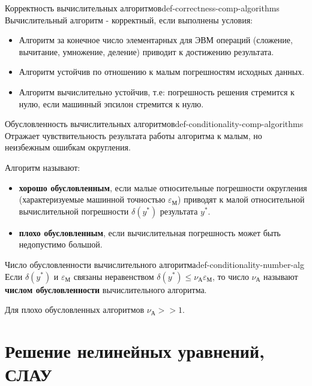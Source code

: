 \documentclass[14pt]{extarticle}
\begin{document}
    \begin{definition}{Корректность вычислительных алгоритмов}{def-correctness-comp-algorithms}
        Вычислительный алгоритм - корректный, если выполнены условия:
        \begin{itemize}
            \item Алгоритм за конечное число элементарных для ЭВМ операций (сложение, вычитание, умножение, деление) приводит к достижению результата.
            \item Алгоритм устойчив по отношению к малым погрешностям исходных данных.
            \item Алгоритм вычислительно устойчив, т.е: погрешность решения стремится к нулю, если машинный эпсилон стремится к нулю.
        \end{itemize}
    \end{definition}

    \begin{definition}{Обусловленность вычислительных алгоритмов}{def-conditionality-comp-algorithms}
        Отражает чувствительность результата работы алгоритма к малым, но неизбежным ошибкам округления.
   
        Алгоритм называют:
        \begin{itemize}
            \item \textbf{хорошо обусловленным}, если малые относительные погрешности округления (характеризуемые машинной точностью $\varepsilon_{\text{М}}$) приводят к малой относительной вычислительной погрешности $\delta(y^{*})$ результата $y^{*}$.
            \item \textbf{плохо обусловленным}, если вычислительная погрешность может быть недопустимо большой.
        \end{itemize}
   
    \end{definition}

    \begin{definition}{Число обусловленности вычислительного алгоритма}{def-conditionality-number-alg}
        Если $\delta(y^{*})$ и $\varepsilon_{\text{М}}$ связаны неравенством $\delta(y^{*}) \leq \nu_{\text{А}}\varepsilon_{\text{М}}$, то число $\nu_{\text{А}}$ называют \textbf{числом обусловленности} вычислительного алгоритма.\\
    \end{definition}

    Для плохо обусловленных алгоритмов $\nu_{\text{А}} >> 1$.


\section{Решение нелинейных уравнений, СЛАУ}
\end{document}
